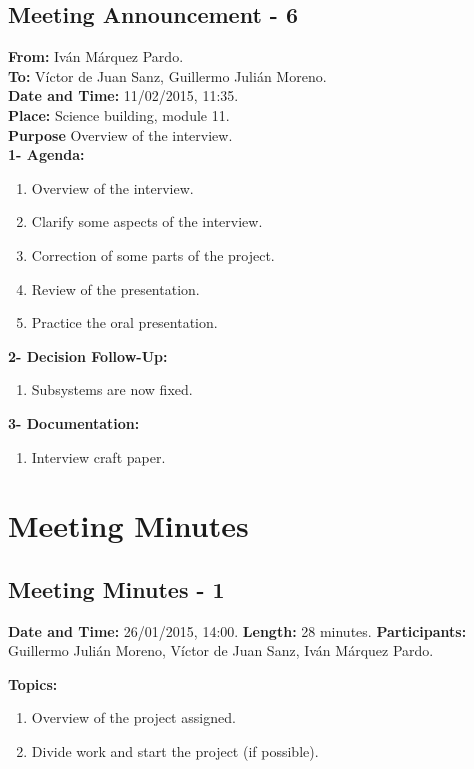 \subsection{Meeting Announcement - 6}

\textbf{From: } Iván Márquez Pardo.\\
\textbf{To: } Víctor de Juan Sanz, Guillermo Julián Moreno.\\

\textbf{Date and Time: } 11/02/2015, 11:35.\\
\textbf{Place: } Science building, module 11.\\

\textbf{Purpose} Overview of the interview. \\

\textbf{1- Agenda:}
\begin{enumerate}
\item Overview of the interview.
\item Clarify some aspects of the interview.
\item Correction of some parts of the project.
\item Review of the presentation.
\item Practice the oral presentation.
\end{enumerate}
\textbf{2- Decision Follow-Up:} 
\begin{enumerate}
\item Subsystems are now fixed.
\end{enumerate}
\textbf{3- Documentation:}
\begin{enumerate}
\item Interview craft paper.
\end{enumerate}


\section{Meeting Minutes}



\subsection{Meeting Minutes - 1}
\textbf{Date and Time:} 26/01/2015, 14:00. 
\textbf{Length:} 28 minutes. 
\textbf{Participants: } Guillermo Julián Moreno, Víctor de Juan Sanz, Iván Márquez Pardo.

\textbf{Topics: } 
\begin{enumerate}
\item Overview of the project assigned.
\item Divide work and start the project (if possible).
\end{enumerate}

